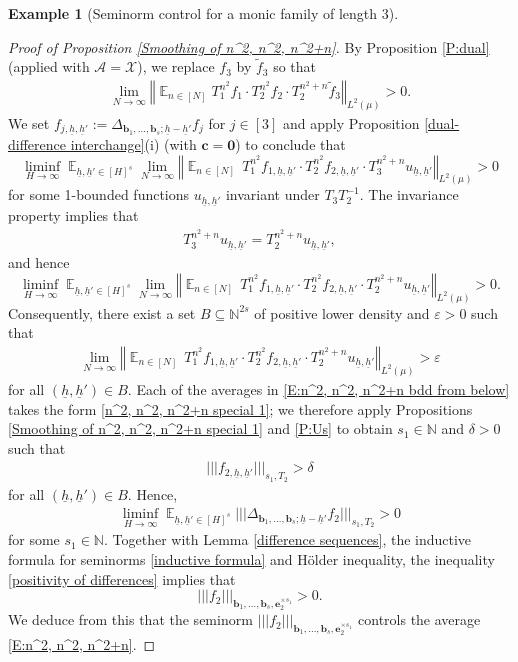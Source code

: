 \documentclass[11pt]{amsart}
\theoremstyle{definition}
\newtheorem{example}{Example}
\newcommand{\N}{{\mathbb N}}
\newcommand{\CA}{{\mathcal A}}
\newcommand{\CX}{{\mathcal X}}
\newcommand{\bc}{{\mathbf{c}}}
\newcommand{\be}{{\mathbf{e}}}
\renewcommand{\b}{{\textbf{b}}}
\newcommand{\uh}{{\underline{h}}}
\newcommand{\bzero}{{\boldsymbol{0}}}
\newcommand{\veps}{\varepsilon}
\newcommand{\norm}[1]{\left\Vert #1\right\Vert}
\newcommand{\nnorm}[1]{\lvert\!|\!| #1|\!|\!\rvert}
\DeclareMathOperator*{\E}{\mathbb{E}}
\begin{document}
\begin{example}[Seminorm control for a monic family of length 3]
\begin{proof}[Proof of Proposition \ref{Smoothing of n^2, n^2, n^2+n}]
By Proposition \ref{P:dual} (applied with $\CA = \CX$),  we replace $f_3$ by $\tilde{f}_3$ so that
\begin{align*}
    \lim_{N\to\infty}\norm{\E_{n\in[N]}T_1^{n^2} f_1 \cdot T_2^{n^2}f_2 \cdot T_2^{n^2+n}\tilde{f}_3}_{L^2(\mu)}>0.
\end{align*}
We set $f_{j,\uh, \uh'} := \Delta_{{\b_1}, \ldots, {\b_{s}}; \uh-\uh'} f_j$ for $j\in[3]$ and apply Proposition \ref{dual-difference interchange}(i) (with $\bc = \bzero$) to conclude that
$$
\liminf_{H\to\infty}\E_{\uh,\uh'\in [H]^{s}} \lim_{N\to\infty}\norm{ \E_{n\in[N]} \, T_1^{n^2} f_{1, \uh, \uh'}\cdot T_2^{n^2} f_{2, \uh, \uh'}\cdot T_3^{n^2+n}u_{\uh,\uh'}}_{L^2(\mu)}>0
$$
for some 1-bounded functions $u_{\uh, \uh'}$ invariant under $T_3 T_2^{-1}$. The invariance property implies that
\begin{align*}
    T_3^{n^2+n} u_{\uh, \uh'} = T_2^{n^2+n} u_{\uh, \uh'},
\end{align*}
and hence
$$
\liminf_{H\to\infty}\E_{\uh,\uh'\in [H]^{s}} \lim_{N\to\infty}\norm{ \E_{n\in[N]} \, T_1^{n^2} f_{1, \uh, \uh'}\cdot T_2^{n^2} f_{2, \uh, \uh'}\cdot T_2^{n^2+n}u_{\uh,\uh'}}_{L^2(\mu)}>0.
$$
Consequently, there exist a set $B\subseteq\N^{2s}$ of positive lower density and $\veps>0$ such that
\begin{align}\label{E:n^2, n^2, n^2+n bdd from below}
    \lim_{N\to\infty}\norm{ \E_{n\in[N]} \, T_1^{n^2} f_{1, \uh, \uh'}\cdot T_2^{n^2} f_{2, \uh, \uh'}\cdot T_2^{n^2+n}u_{\uh,\uh'}}_{L^2(\mu)}>\veps
\end{align}
for all $(\uh, \uh')\in B$. Each of the averages in \eqref{E:n^2, n^2, n^2+n bdd from below} takes the form \eqref{n^2, n^2, n^2+n special 1}; we therefore apply Propositions \ref{Smoothing of n^2, n^2, n^2+n special 1} and \ref{P:Us} to obtain $s_1\in\N$ and $\delta>0$ such that
\begin{align*}%
\nnorm{f_{2, \uh, \uh'}}_{s_1, T_2} > \delta
\end{align*}
for all $(\uh, \uh')\in B$. Hence,
\begin{align}\label{positivity of differences}
    \liminf_{H \to\infty}\E_{\uh,\uh'\in [H]^{s}} \nnorm{\Delta_{{\b_1}, \ldots, {\b_{s}}; \uh-\uh'} f_2}_{s_1, T_2} >0
\end{align}
for some $s_1\in\N$. Together with Lemma \ref{difference sequences}, the inductive formula for seminorms \eqref{inductive formula}  and H\"older inequality, the inequality \eqref{positivity of differences}  implies that
$$
\nnorm{f_2}_{{\b_1}, \ldots, {\b_{s}}, \be_2^{\times s_1}}>0.
$$
We deduce from this that the seminorm $\nnorm{f_2}_{{\b_1}, \ldots, {\b_{s}}, \be_2^{\times s_1}}$ controls the average \eqref{E:n^2, n^2, n^2+n}.


\end{proof}
\end{example}
\end{document}
